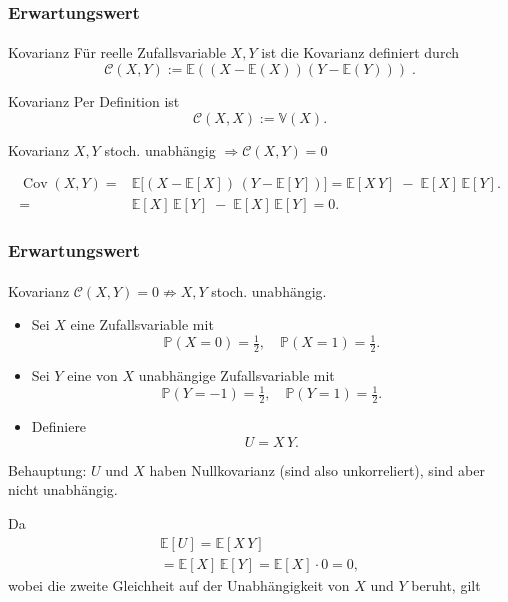 \documentclass{beamer}
\renewcommand{\Pr}{\mathbb{P}}
\begin{document}
 \begin{frame}
    \frametitle{Erwartungswert}
\framesubtitle{}
\begin{block}{Kovarianz}
Für  reelle Zufallsvariable $X,Y$ ist die Kovarianz definiert durch
$$ \mathcal{C} (X,Y) :=  \mathbb{E}( (X - \mathbb{E}(X)) (Y - \mathbb{E}(Y))) \; .$$
\end{block}

\begin{block}{Kovarianz}
    Per Definition ist
    $$ \mathcal{C} (X,X) :=  \mathbb{V}(X).$$
    \end{block}
    \begin{block}{Kovarianz}
        $X,Y$ stoch. unabhängig
        $ \Rightarrow \mathcal{C} (X,Y) =  0$
        \end{block}
            \begin{align*}
            \operatorname{Cov}(X,Y)
            = &\mathbb{E}\bigl[(X - \mathbb{E}[X])\,(Y - \mathbb{E}[Y])\bigr] 
            = \mathbb{E}[X\,Y] \;-\; \mathbb{E}[X]\,\mathbb{E}[Y].\\
             = &\mathbb{E}[X]\,\mathbb{E}[Y] \;-\; \mathbb{E}[X]\,\mathbb{E}[Y]
            = 0.
        \end{align*}
 \end{frame}

 \begin{frame}
    \frametitle{Erwartungswert}
\framesubtitle{}

    \begin{block}{Kovarianz}
        $ \mathcal{C} (X,Y) =  0    \nRightarrow     X,Y$ stoch. unabhängig.
        \end{block}

        \begin{itemize}
            \item Sei $X$ eine Zufallsvariable mit
              \[
                \Pr(X=0)=\tfrac12,\quad \Pr(X=1)=\tfrac12.
              \]
            \item Sei $Y$ eine von $X$ unabhängige Zufallsvariable mit
              \[
                \Pr(Y=-1)=\tfrac12,\quad \Pr(Y=1)=\tfrac12.
              \]
            \item Definiere
              \[
                U = X\,Y.
              \]
          \end{itemize}
          
          Behauptung: $U$ und $X$ haben Nullkovarianz (sind also unkorreliert), sind aber nicht unabhängig.
          
          \medskip
          
          Da
          \begin{align*}
            \mathbb{E}[U]
            = \mathbb{E}[X\,Y] \\
            = \mathbb{E}[X]\,\mathbb{E}[Y]
            = \mathbb{E}[X]\cdot 0
            = 0,
          \end{align*}
          wobei die zweite Gleichheit auf der Unabhängigkeit von $X$ und $Y$ beruht, gilt
          
                  
\end{frame}
 
\end{document}
